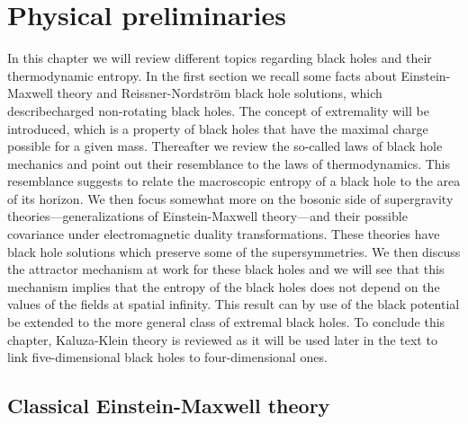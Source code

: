 \documentclass[12pt,twoside]{book}
\begin{document}
\newpage
\thispagestyle{empty}
\chapter{Physical preliminaries}
\label{ch:physBack}

In this chapter we will review different topics regarding black holes and their thermodynamic entropy. In the first section we recall some facts about Einstein-Maxwell theory and Reissner-Nordstr\"om black hole solutions, which describe\linebreak[4] charged non-rotating black holes. The concept of extremality will be introduced, which is a property of black holes that have the maximal charge possible for a given mass. Thereafter we review the so-called laws of black hole mechanics and point out their resemblance to the laws of thermodynamics. This resemblance suggests to relate the macroscopic entropy of a black hole to the area of its horizon. We then focus somewhat more on the bosonic side of supergravity theories---generalizations of Einstein-Maxwell theory---and their possible covariance under electromagnetic duality transformations. These theories have black hole solutions which preserve some of the supersymmetries. We then discuss the attractor mechanism at work for these black holes and we will see that this mechanism implies that the entropy of the black holes does not depend on the values of the fields at spatial infinity. This result can by use of the black potential be extended to the more general class of extremal black holes. To conclude this chapter, Kaluza-Klein theory is reviewed as it will be used later in the text to link five-dimensional black holes to four-dimensional ones.

\section{Classical Einstein-Maxwell theory}
\label{EM-theory}
\end{document}
